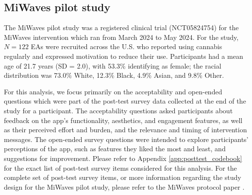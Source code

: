 \subsection{MiWaves pilot study}
\label{sec:miwaves_pilot_study}
The MiWaves pilot study was a registered clinical trial (NCT05824754) for the MiWaves intervention which ran from March 2024 to May 2024. For the study, $N=122$ EAs were recruited
across the U.S. who reported using cannabis regularly and expressed motivation to reduce their use. Participants had a mean age of 21.7 years (SD = 2.0), with 53.3\% identifying as female; the racial distribution was 73.0\% White, 12.3\% Black, 4.9\% Asian, and 9.8\% Other.


For this analysis, we focus primarily on the acceptability and open-ended questions which were part of the post-test survey data collected at the end of the study for a participant. 
The acceptability questions asked participants about feedback on the app’s functionality, aesthetics, and engagement features, as well as their perceived effort and burden, and the relevance and timing of intervention messages. The open-ended survey questions were intended to explore participants’ perceptions of the app, such as features they liked the most and least, and suggestions for improvement. Please refer to Appendix \ref{app:posttest_codebook} for the exact list of post-test survey items considered for this analysis. For the complete set of post-test survey items, or more information regarding the study design for the MiWaves pilot study, please refer to the MiWaves protocol paper \cite{coughlin2024mobile}.

